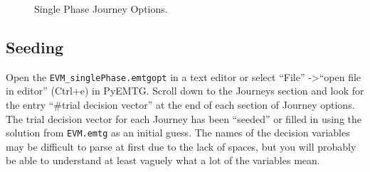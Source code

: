 \documentclass[11pt]{article}
\begin{document}
\begin{figure}[H]
	\centering
	\caption{\label{fig:single_phase_journey_options}Single Phase Journey Options.}
\end{figure}

\subsection{Seeding}
\label{sec:seeding}

Open the \texttt{EVM\_singlePhase.emtgopt} in a text editor or select “File” -\textgreater “open file in editor” (Ctrl+e) in PyEMTG. Scroll down to the Journeys section and look for the entry ``\#trial decision vector'' at the end of each section of Journey options. The trial decision vector for each Journey has been ``seeded'' or filled in using the solution from \texttt{EVM.emtg} as an initial guess. The names of the decision variables may be difficult to parse at first due to the lack of spaces, but you will probably be able to understand at least vaguely what a lot of the variables mean.
\end{document}
